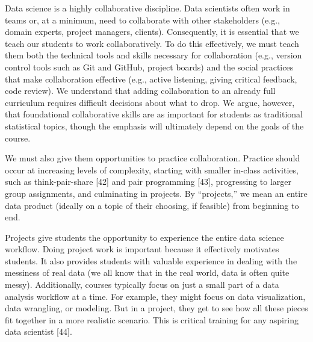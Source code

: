 \documentclass[
  10pt,
  letterpaper,
]{article}
\begin{document}
Data science is a highly collaborative discipline. Data scientists often
work in teams or, at a minimum, need to collaborate with other
stakeholders (e.g., domain experts, project managers, clients).
Consequently, it is essential that we teach our students to work
collaboratively. To do this effectively, we must teach them both the
technical tools and skills necessary for collaboration (e.g., version
control tools such as Git and GitHub, project boards) and the social
practices that make collaboration effective (e.g., active listening,
giving critical feedback, code review). We understand that adding
collaboration to an already full curriculum requires difficult decisions
about what to drop. We argue, however, that foundational collaborative
skills are as important for students as traditional statistical topics,
though the emphasis will ultimately depend on the goals of the course.

We must also give them opportunities to practice collaboration. Practice
should occur at increasing levels of complexity, starting with smaller
in-class activities, such as think-pair-share {[}42{]} and pair
programming {[}43{]}, progressing to larger group assignments, and
culminating in projects. By ``projects,'' we mean an entire data product
(ideally on a topic of their choosing, if feasible) from beginning to
end.

Projects give students the opportunity to experience the entire data
science workflow. Doing project work is important because it effectively
motivates students. It also provides students with valuable experience
in dealing with the messiness of real data (we all know that in the real
world, data is often quite messy). Additionally, courses typically focus
on just a small part of a data analysis workflow at a time. For example,
they might focus on data visualization, data wrangling, or modeling. But
in a project, they get to see how all these pieces fit together in a
more realistic scenario. This is critical training for any aspiring data
scientist {[}44{]}.
\end{document}
